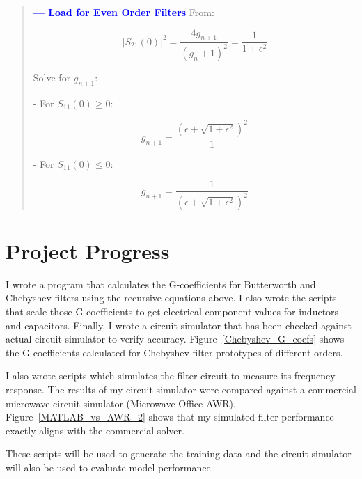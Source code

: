 \documentclass[10pt,conference]{IEEEtran}
\begin{document}
\begin{quote}
	\textcolor{blue}{ \textbf{ --- Load for Even Order Filters} }
	From:

	\begin{equation}\label{eq:s21}
	|S_{21}(0)|^2 = \frac{4g_{n+1}}{(g_n + 1)^2} = \frac{1}{1 + \epsilon^2}
	\end{equation}

	Solve for \( g_{n+1} \):

	- For \( S_{11}(0) \geq 0 \):

	\begin{equation}\label{eq:gnp1_positive}
	g_{n+1} = \frac{\left( \epsilon + \sqrt{1 + \epsilon^2} \right)^2}{1}
	\end{equation}

	- For \( S_{11}(0) \leq 0 \):

	\begin{equation}\label{eq:gnp1_negative}
	g_{n+1} = \frac{1}{\left( \epsilon + \sqrt{1 + \epsilon^2} \right)^2}
	\end{equation}

\end{quote}



\section{Project Progress}

I wrote a program that calculates the G-coefficients for Butterworth and Chebyshev filters using the recursive equations above. I also wrote the scripts that scale those G-coefficients to get electrical component values for inductors and capacitors. Finally, I wrote a circuit simulator that has been checked against actual circuit simulator to verify accuracy. Figure~\ref{Chebyshev_G_coefs} shows the G-coefficients calculated for Chebyshev filter prototypes of different orders.


I also wrote scripts which simulates the filter circuit to measure its frequency response. The results of my circuit simulator were compared against a commercial microwave circuit simulator (Microwave Office AWR). Figure~\ref{MATLAB_vs_AWR_2} shows that my simulated filter performance exactly aligns with the commercial solver.

These scripts will be used to generate the training data and the circuit simulator will also be used to evaluate model performance.
\end{document}
